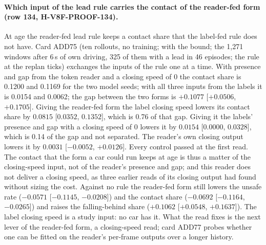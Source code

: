 \paragraph{Which input of the lead rule carries the contact of the reader-fed form (row 134, H-V8F-PROOF-134).} At age the reader-fed lead rule keeps a contact share that the label-fed rule does not have. Card ADD75 (ten rollouts, no training;  with the bound; the 1,271 windows after 6\,s of own driving, 325 of them with a lead in 46 episodes; the rule at the replan ticks) exchanges the inputs of the rule one at a time. With presence and gap from the token reader and a closing speed of 0 the contact share is 0.1200 and 0.1169 for the two model seeds; with all three inputs from the labels it is 0.0154 and 0.0062; the gap between the two forms is $+0.1077$ [$+0.0506$, $+0.1705$]. Giving the reader-fed form the label closing speed lowers its contact share by $0.0815$ [$0.0352$, $0.1352$], which is 0.76 of that gap. Giving it the labels' presence and gap with a closing speed of 0 lowers it by $0.0154$ [$0.0000$, $0.0328$], which is 0.14 of the gap and not separated. The reader's own closing output lowers it by $0.0031$ [$-0.0052$, $+0.0126$]. Every control passed at the first read. The contact that the form a car could run keeps at age is thus a matter of the closing-speed input, not of the reader's presence and gap; and this reader does not deliver a closing speed, as three earlier reads of its closing output had found without sizing the cost. Against no rule the reader-fed form still lowers the unsafe rate ($-0.0571$ [$-0.1145$, $-0.0208$]) and the contact share ($-0.0692$ [$-0.1164$, $-0.0265$]) and raises the falling-behind share ($+0.1062$ [$+0.0548$, $+0.1637$]). The label closing speed is a study input: no car has it. What the read fixes is the next lever of the reader-fed form, a closing-speed read; card ADD77 probes whether one can be fitted on the reader's per-frame outputs over a longer history.

